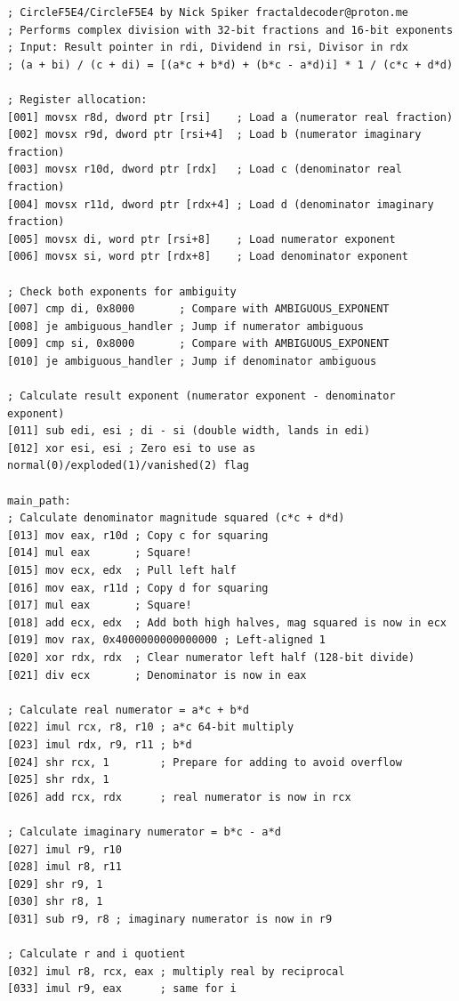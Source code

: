 \documentclass[12pt,letter]{article}
\begin{document}
\newpage
\begin{lstlisting}[style=rust, caption={Complete Complex Division Assembly Implementation}, label={fig:circle_divide}]
; CircleF5E4/CircleF5E4 by Nick Spiker fractaldecoder@proton.me
; Performs complex division with 32-bit fractions and 16-bit exponents
; Input: Result pointer in rdi, Dividend in rsi, Divisor in rdx
; (a + bi) / (c + di) = [(a*c + b*d) + (b*c - a*d)i] * 1 / (c*c + d*d)

; Register allocation:
[001] movsx r8d, dword ptr [rsi]    ; Load a (numerator real fraction)
[002] movsx r9d, dword ptr [rsi+4]  ; Load b (numerator imaginary fraction)
[003] movsx r10d, dword ptr [rdx]   ; Load c (denominator real fraction)
[004] movsx r11d, dword ptr [rdx+4] ; Load d (denominator imaginary fraction)
[005] movsx di, word ptr [rsi+8]    ; Load numerator exponent
[006] movsx si, word ptr [rdx+8]    ; Load denominator exponent

; Check both exponents for ambiguity
[007] cmp di, 0x8000       ; Compare with AMBIGUOUS_EXPONENT
[008] je ambiguous_handler ; Jump if numerator ambiguous
[009] cmp si, 0x8000       ; Compare with AMBIGUOUS_EXPONENT
[010] je ambiguous_handler ; Jump if denominator ambiguous

; Calculate result exponent (numerator exponent - denominator exponent)
[011] sub edi, esi ; di - si (double width, lands in edi)
[012] xor esi, esi ; Zero esi to use as normal(0)/exploded(1)/vanished(2) flag

main_path:
; Calculate denominator magnitude squared (c*c + d*d)
[013] mov eax, r10d ; Copy c for squaring
[014] mul eax       ; Square!
[015] mov ecx, edx  ; Pull left half
[016] mov eax, r11d ; Copy d for squaring
[017] mul eax       ; Square!
[018] add ecx, edx  ; Add both high halves, mag squared is now in ecx
[019] mov rax, 0x4000000000000000 ; Left-aligned 1
[020] xor rdx, rdx  ; Clear numerator left half (128-bit divide)
[021] div ecx       ; Denominator is now in eax

; Calculate real numerator = a*c + b*d
[022] imul rcx, r8, r10 ; a*c 64-bit multiply
[023] imul rdx, r9, r11 ; b*d
[024] shr rcx, 1        ; Prepare for adding to avoid overflow
[025] shr rdx, 1
[026] add rcx, rdx      ; real numerator is now in rcx

; Calculate imaginary numerator = b*c - a*d
[027] imul r9, r10
[028] imul r8, r11
[029] shr r9, 1
[030] shr r8, 1
[031] sub r9, r8 ; imaginary numerator is now in r9

; Calculate r and i quotient
[032] imul r8, rcx, eax ; multiply real by reciprocal
[033] imul r9, eax      ; same for i


\end{lstlisting}
\end{document}

